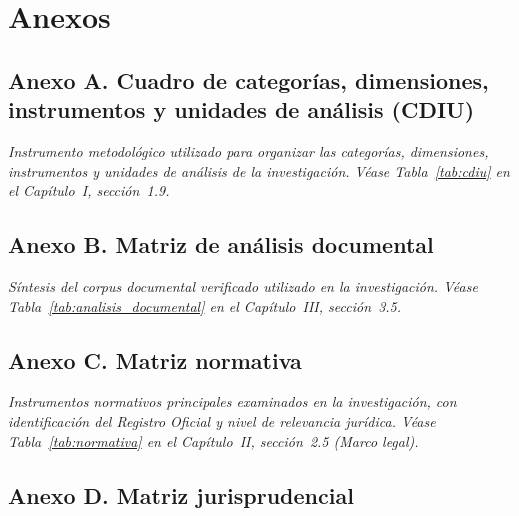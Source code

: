 
\chapter{Anexos}

\section*{Anexo A. Cuadro de categorías, dimensiones, instrumentos y unidades de análisis (CDIU)}

\noindent\textit{Instrumento metodológico utilizado para organizar las categorías, dimensiones, instrumentos y unidades de análisis de la investigación. Véase Tabla~\ref{tab:cdiu} en el Capítulo~I, sección~1.9.}

\section*{Anexo B. Matriz de análisis documental}

\noindent\textit{Síntesis del corpus documental verificado utilizado en la investigación. Véase Tabla~\ref{tab:analisis_documental} en el Capítulo~III, sección~3.5.}

\section*{Anexo C. Matriz normativa}

\noindent\textit{Instrumentos normativos principales examinados en la investigación, con identificación del Registro Oficial y nivel de relevancia jurídica. Véase Tabla~\ref{tab:normativa} en el Capítulo~II, sección~2.5 (Marco legal).}

\section*{Anexo D. Matriz jurisprudencial}

